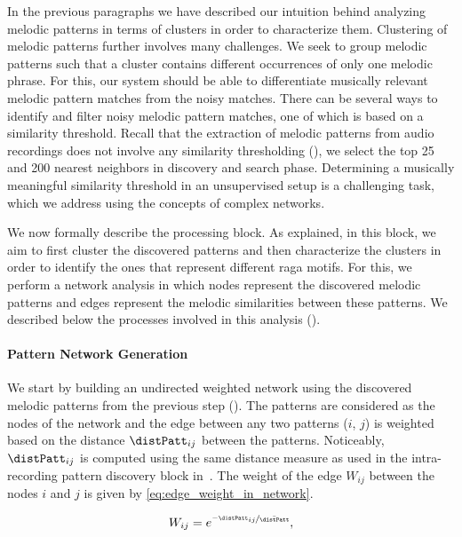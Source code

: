 {In the previous paragraphs we have described our intuition behind analyzing melodic patterns in terms of clusters in order to characterize them. Clustering of melodic patterns further involves many challenges. We seek to group melodic patterns such that a cluster contains different occurrences of only one melodic phrase. For this, our system should be able to differentiate musically relevant melodic pattern matches from the noisy matches. There can be several ways to identify and filter noisy melodic pattern matches, one of which is based on a similarity threshold. Recall that the extraction of melodic patterns from audio recordings does not involve any similarity thresholding (), we select the top 25 and 200 nearest neighbors in discovery and search phase. Determining a musically meaningful similarity threshold in an unsupervised setup is a challenging task, which we address using the concepts of complex networks. 
 
We now formally describe the processing block. As explained, in this block, we aim to first cluster the discovered patterns and then characterize the clusters in order to identify the ones that represent different \gls{raga} motifs. For this, we perform a network analysis in which nodes represent the discovered melodic patterns and edges represent the melodic similarities between these patterns. We described below the processes involved in this analysis (). 


\paragraph{Pattern Network Generation}
\label{sec:network_generation}

We start by building an undirected weighted network using the discovered melodic patterns from the previous step (). The patterns are considered as the nodes of the network and the edge between any two patterns ($i$, $j$) is weighted based on the distance $\distPatt_{ij}$ between the patterns. Noticeably, $\distPatt_{ij}$ is computed using the same distance measure as used in the intra-recording pattern discovery block in~. The weight of the edge $W_{ij}$ between the nodes $i$ and $j$ is given by \eqref{eq:edge_weight_in_network}. 

\begin{equation}
W_{ij} = e^{\nicefrac{-\distPatt_{ij}}{\bar{\distPatt}}},
\label{eq:edge_weight_in_network}
\end{equation}

}
